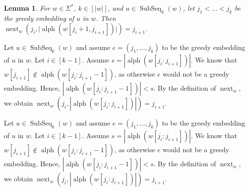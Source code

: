 \documentclass[10pt,a4paper]{amsart}
\makeatletter
\DeclareMathOperator{\alphabet}{alph}
\DeclareMathOperator{\al}{alph}
\DeclareMathOperator\ScatFact{SubSeq}
\DeclareMathOperator{\nextAlphPos}{next}
\newif\ifpaper
\theoremstyle{plain}
\newtheorem{lemma}{Lemma}
\theoremstyle{definition}
\renewenvironment{proof}[1][\proofname]{\par
  \pushQED{}%
  \normalfont \topsep6\p@\@plus6\p@\relax
  \trivlist
  \item[\hskip\labelsep\itshape #1\@addpunct{.}]\ignorespaces
}{%
  \popQED\endtrivlist\@endpefalse
}
\makeatother
\begin{document}
\begin{lemma}
    \label{lemma:next-function-property-scatfact-implies-sequence}
    For $w \in \Sigma^*$, $k \in [\vert w \vert]$, and $u \in \ScatFact_k(w)$, let $ j_1 < \dots < j_k $ be the greedy embedding of $u$ in $w$. Then $\nextAlphPos_w(j_i, \vert \alphabet(w[j_i + 1, j_{i + 1}]) \vert) = j_{i+1}$.
\end{lemma}
\ifpaper
\begin{proof}
	Let $u\in\ScatFact_k(w)$ and assume $e = (j_1,...,j_k)$ to be the greedy embedding of $u$ in $w$. Let $i\in[k-1]$. Assume $s = |\al(w[j_i : j_{i+1}])|$. We know that $w[j_{i+1}]\notin\al(w[j_i : j_{i+1}-1])$, as otherwise $e$ would not be a greedy embedding. Hence, $|\al(w[j_i : j_{i+1}-1])| < s$. By the definition of $\nextAlphPos_w$, we obtain $\nextAlphPos_w(j_i,|\al(w[j_i : j_{i+1}])|) = j_{i+1}$.
\end{proof}

\else
\begin{proof}
	Let $u\in\ScatFact_k(w)$ and assume $e = (j_1,...,j_k)$ to be the greedy embedding of $u$ in $w$. Let $i\in[k-1]$. Assume $s = |\al(w[j_i : j_{i+1}])|$. We know that $w[j_{i+1}]\notin\al(w[j_i : j_{i+1}-1])$, as otherwise $e$ would not be a greedy embedding. Hence, $|\al(w[j_i : j_{i+1}-1])| < s$. By the definition of $\nextAlphPos_w$, we obtain $\nextAlphPos_w(j_i,|\al(w[j_i : j_{i+1}])|) = j_{i+1}$.
\end{proof}
\end{document}
